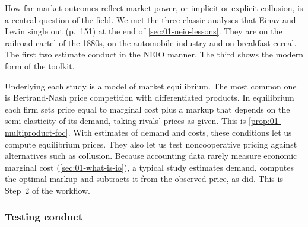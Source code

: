 How far market outcomes reflect market power, or implicit or explicit collusion, is a central question of
the field. We met the three classic analyses that Einav and Levin single out (p.~151) at the end of
\cref{sec:01-neio-lessons}. They are \citet{Porter1983} on the railroad cartel of the 1880s,
\citet{Bresnahan1987} on the automobile industry and \citet{Nevo2001} on breakfast cereal. The first two estimate conduct in the
NEIO manner. The third shows the modern form of the toolkit.

Underlying each study is a model of market equilibrium. The most common one is Bertrand-Nash price
competition with differentiated products. In equilibrium each firm sets price equal to marginal cost plus a
markup that depends on the semi-elasticity of its demand, taking rivals' prices as given. This is
\cref{prop:01-multiproduct-foc}. With estimates of demand and costs, these conditions let us compute
equilibrium prices. They also let us test noncooperative pricing against alternatives such as collusion.
Because accounting data rarely measure economic marginal cost (\cref{sec:01-what-is-io}), a typical study
estimates demand, computes the optimal markup and subtracts it from the observed price, as \citet{Rosse1970}
did. This is Step~2 of the workflow.

\subsubsection{Testing conduct}

